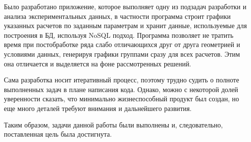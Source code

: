 \documentclass[14pt]{extreport}
\begin{document}
Было разработано приложение, которое выполняет одну из подзадач разработки и анализа экспериментальных данных, в частности программа строит графики указанных расчетов по заданным параметрам и хранит данные, используемые для построения в БД, используя NoSQL подход. Программа позволяет не тратить время при постобработке ряда слабо отличающихся друг от друга геометрией и условиями данных, генерируя графики группами сразу для всех расчетов. Этим она отличается и выделяется на фоне рассмотренных решений.  

Сама разработка носит итеративный процесс, поэтому трудно судить о полноте выполненных задач в плане написания кода. Однако, можно с некоторой долей уверенности сказать, что минимально жизнеспособный продукт был создан, но еще много деталей требуют внимания и дальнейшего развития.

Таким образом, задачи данной работы были выполнены и, следовательно, поставленная цель была достигнута. 



% 
\end{document}
